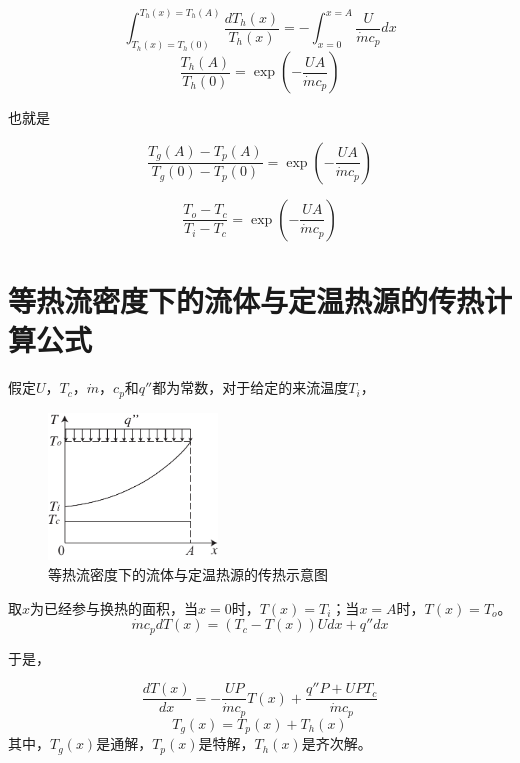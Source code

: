\begin{equation}
\int_{T_{h}(x)=T_{h}(0)}^{T_{h}(x)=T_{h}(A)}\frac{dT_{h}(x)}{T_{h}(x)}=-\int_{x=0}^{x=A}\frac{U}{\dot{m}c_{p}}dx
\end{equation}
\begin{equation}
\frac{T_{h}(A)}{T_{h}(0)}=\exp(-\frac{UA}{\dot{m}c_{p}})
\end{equation}

也就是

\begin{equation}
\frac{T_{g}(A)-T_{p}(A)}{T_{g}(0)-T_{p}(0)}=\exp(-\frac{UA}{\dot{m}c_{p}})
\end{equation}

\begin{equation}
\frac{T_{o}-T_{c}}{T_{i}-T_{c}}=\exp(-\frac{UA}{\dot{m}c_{p}})
\label{eq:Eq}
\end{equation}

\chapter{等热流密度下的流体与定温热源的传热计算公式}
\label{cha:CTCHFHX}

假定$U$，$T_{c}$，$\dot{m}$，$c_p$和$q''$都为常数，对于给定的来流温度${T_i}$，

\begin{figure}[h]
\begin{centering}
\includegraphics[width=0.4\textwidth]{fig/CTCHFHX.pdf}\caption{等热流密度下的流体与定温热源的传热示意图}
\label{fig:CTCHFHX}
\end{centering}
\end{figure}

取$x$为已经参与换热的面积，当$x=0$时，$T(x)=T_i$；当$x=A$时，$T(x)=T_o$。
\begin{equation}
\dot{m}c_{p}dT(x)=(T_{c}-T(x))Udx+q''dx
\end{equation}

于是，

\begin{equation}
\frac{dT(x)}{dx}=-\frac{UP}{\dot{m}c_{p}}T(x)+\frac{q''P+UPT_{c}}{\dot{m}c_{p}}
\end{equation}
\begin{equation}
T_{g}(x)=T_{p}(x)+T_{h}(x)
\end{equation}
其中，$T_{g}(x)$是通解，$T_{p}(x)$是特解，$T_{h}(x)$是齐次解。

